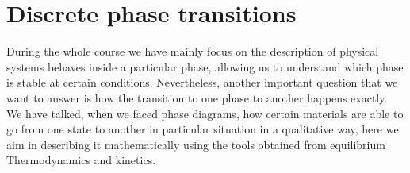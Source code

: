\section{Discrete phase transitions}

During the whole course we have mainly focus on the description of physical systems behaves inside a particular phase, allowing us to understand which phase is stable at certain conditions. Nevertheless, another important question that we want to answer is how the transition to one phase to another happens exactly. We have talked, when we faced phase diagrams, how certain materials are able to go from one state to another in particular situation in a qualitative way, here we aim in describing it mathematically using the tools obtained from equilibrium Thermodynamics and kinetics.


